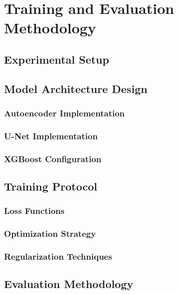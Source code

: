 \documentclass[12pt,a4paper]{report}
\begin{document}
\chapter{Training and Evaluation Methodology}
\label{chap:methodology}

\section{Experimental Setup}

\section{Model Architecture Design}


\subsection{Autoencoder Implementation}


\subsection{U-Net Implementation}


\subsection{XGBoost Configuration}


\section{Training Protocol}



\subsection{Loss Functions}


\subsection{Optimization Strategy}


\subsection{Regularization Techniques}


\section{Evaluation Methodology}
\end{document}
